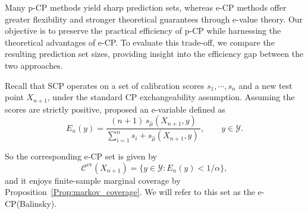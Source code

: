 \documentclass{article}
\theoremstyle{plain}
\theoremstyle{definition}
\theoremstyle{remark}
\begin{document}

Many p-CP methods yield sharp prediction sets, whereas e-CP methods offer greater flexibility and stronger theoretical guarantees through e-value theory. Our objective is to preserve the practical efficiency of p-CP while harnessing the theoretical advantages of e-CP. To evaluate this trade-off, we compare the resulting prediction set sizes, providing insight into the efficiency gap between the two approaches.

Recall that SCP operates on a set of calibration scores $s_1,\cdots,s_n$  and a new test point $X_{n+1}$, under the standard CP exchangeability assumption. Assuming the scores are  strictly positive, \citet{balinsky2024} proposed an e-variable defined as
\begin{equation}\label{appendix:balinsky_evalue}
E_{n}(y)
= \frac{(n+1)\,s_{\hat\mu}(X_{n+1},y)}{\sum_{i=1}^n s_i+ s_{\hat\mu}(X_{n+1},y)\,},
\qquad y \in \mathcal{Y}.
\end{equation}

So the corresponding e-CP set is given by
\begin{equation}\label{appendix:e-cpset}
\mathcal{C}^{\mathrm{ev}}(X_{n+1})
= \bigl\{ y \in \mathcal{Y} : E_n(y) < 1/\alpha \bigr\},
\end{equation}
and it enjoys finite-sample marginal coverage by Proposition~\ref{Prop:markov_coverage}. We will refer to this set as the e-CP(Balinsky).


\end{document}
